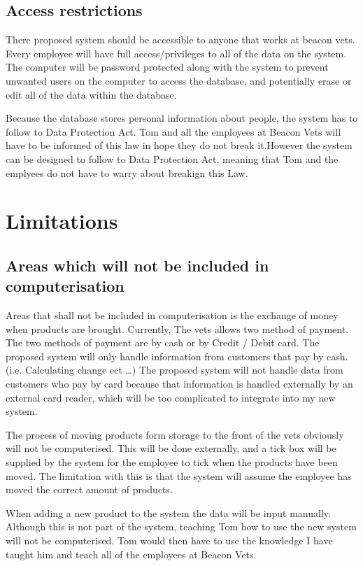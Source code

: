\subsection{Access restrictions}

\begin{flushleft}
There proposed system should be accessible to anyone that works at beacon vets. Every employee will have full access/privileges to all of the data on the system. The computer will be password protected along with the system to prevent unwanted users on the computer to access the database, and potentially erase or edit all of the data within the database. \par
Because the database stores personal information about people, the system has to follow to Data Protection Act. Tom and all the employees at Beacon Vets will have to be informed of this law in hope they do not break it.However the system can be designed to follow to Data Protection Act, meaning that Tom and the emplyees do not have to warry about breakign this Law.
\end{flushleft}

\section{Limitations}

\subsection{Areas which will not be included in computerisation}

\begin{flushleft}
Areas that shall not be included in computerisation is the exchange of money when products are brought. Currently, The vets allows two method of payment. The two methods of payment are by cash or by Credit / Debit card. The proposed system will only handle information from customers that pay by cash.(i.e. Calculating change ect \ldots) The proposed system will not handle data from customers who pay by card because that information is handled externally by an external card reader, which will be too complicated to integrate into my new system. \par 

The process of moving products form storage to the front of the vets obviously will not be computerised. This will be done externally, and a tick box will be supplied by the system for the employee to tick when the products have been moved. The limitation with this is that the system will assume the employee has moved the correct amount of products. \par

When adding a new product to the system the data will be input manually. Although this is not part of the system, teaching Tom how to use the new system will not be computerised. Tom would then have to use the knowledge I have taught him and teach all of the employees at Beacon Vets.
\end{flushleft}

